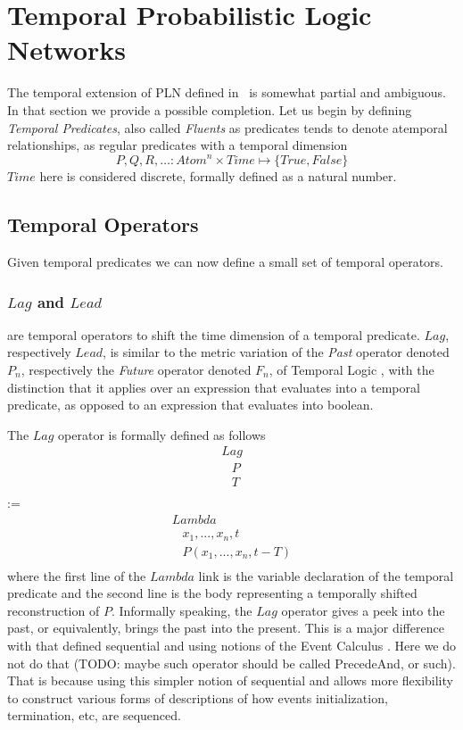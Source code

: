 \documentclass[runningheads]{llncs}
\newcommand{\SP}{\;\;\;}
\newcommand{\TTrue}{\textit{True}}
\newcommand{\TFalse}{\textit{False}}
\newcommand{\TAtom}{\textit{Atom}}
\newcommand{\TTime}{\textit{Time}}
\newcommand{\TLamb}{\textit{Lambda}}
\newcommand{\TLag}{\textit{Lag}}
\newcommand{\TLead}{\textit{Lead}}
\begin{document}
\section{Temporal Probabilistic Logic Networks}

The temporal extension of PLN defined in~\cite{TODO} is somewhat
partial and ambiguous.  In that section we provide a possible
completion.
Let us begin by defining \emph{Temporal Predicates}, also called
\emph{Fluents} as predicates tends to denote atemporal relationships,
as regular predicates with a temporal dimension
$$P, Q, R, \hdots: \TAtom^n \times \TTime \mapsto \{\TTrue,
\TFalse\}$$ $\TTime$ here is considered discrete, formally defined as
a natural number.

\subsection{Temporal Operators}
Given temporal predicates we can now define a small set of temporal
operators.

\subsubsection{$\TLag$ and $\TLead$} are temporal operators to shift the
time dimension of a temporal predicate.  $\TLag$, respectively
$\TLead$, is similar to the metric variation of the \emph{Past}
operator denoted $P_n$, respectively the \emph{Future} operator
denoted $F_n$, of Temporal Logic \cite{Prior 1967, Chapter VI}, with
the distinction that it applies over an expression that evaluates into
a temporal predicate, as opposed to an expression that evaluates into
boolean.

The $\TLag$ operator is formally defined as follows
$$
\begin{array}{l}
  \TLag\\
  \SP P\\
  \SP T\\
\end{array}
$$
:=
$$
\begin{array}{l}
  \TLamb\\
  \SP x_1, ..., x_n, t\\
  \SP P(x_1, ..., x_n, t-T)\\
\end{array}
$$
where the first line of the $\TLamb$ link is the variable
declaration of the temporal predicate and the second line is the body
representing a temporally shifted reconstruction of $P$.  Informally
speaking, the $\TLag$ operator gives a peek into the past, or
equivalently, brings the past into the present.  This is a major
difference with \cite{PLN} that defined sequential and using notions
of the Event Calculus \cite{TODO}.  Here we do not do that (TODO:
maybe such operator should be called PrecedeAnd, or such).  That is
because using this simpler notion of sequential and allows more
flexibility to construct various forms of descriptions of how events
initialization, termination, etc, are sequenced.
\end{document}
